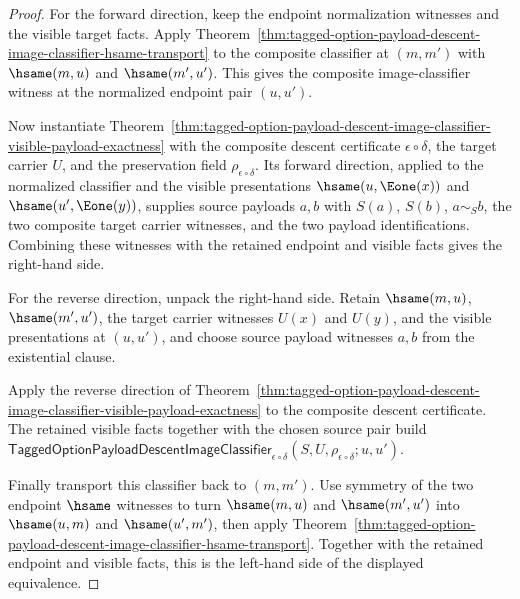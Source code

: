 \begin{proof}
For the forward direction, keep the endpoint normalization witnesses and the
visible target facts. Apply
Theorem~\ref{thm:tagged-option-payload-descent-image-classifier-hsame-transport}
to the composite classifier at $(m,m')$ with $\hsame(m,u)$ and
$\hsame(m',u')$. This gives the composite image-classifier witness at the
normalized endpoint pair $(u,u')$.

Now instantiate
Theorem~\ref{thm:tagged-option-payload-descent-image-classifier-visible-payload-exactness}
with the composite descent certificate $\epsilon\circ\delta$, the target carrier
$U$, and the preservation field $\rho_{\epsilon\circ\delta}$. Its forward
direction, applied to the normalized classifier and the visible presentations
$\hsame(u,\Eone(x))$ and $\hsame(u',\Eone(y))$, supplies source payloads $a,b$
with $S(a)$, $S(b)$, $a\sim_S b$, the two composite target carrier witnesses,
and the two payload identifications. Combining these witnesses with the retained
endpoint and visible facts gives the right-hand side.

For the reverse direction, unpack the right-hand side. Retain
$\hsame(m,u)$, $\hsame(m',u')$, the target carrier witnesses $U(x)$ and $U(y)$,
and the visible presentations at $(u,u')$, and choose source payload witnesses
$a,b$ from the existential clause.

Apply the reverse direction of
Theorem~\ref{thm:tagged-option-payload-descent-image-classifier-visible-payload-exactness}
to the composite descent certificate. The retained visible facts together with
the chosen source pair build
$\mathsf{TaggedOptionPayloadDescentImageClassifier}_{\epsilon\circ\delta}
(S,U,\rho_{\epsilon\circ\delta};u,u')$.

Finally transport this classifier back to $(m,m')$. Use symmetry of the two
endpoint $\hsame$ witnesses to turn $\hsame(m,u)$ and $\hsame(m',u')$ into
$\hsame(u,m)$ and $\hsame(u',m')$, then apply
Theorem~\ref{thm:tagged-option-payload-descent-image-classifier-hsame-transport}.
Together with the retained endpoint and visible facts, this is the left-hand
side of the displayed equivalence.
\end{proof}

